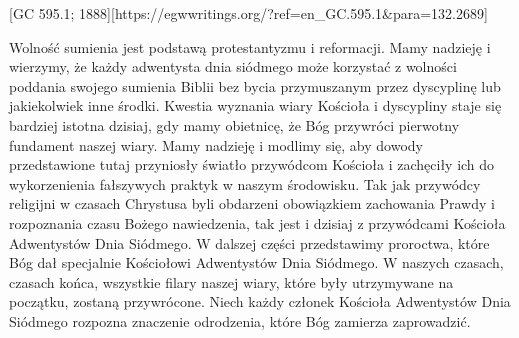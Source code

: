 [GC 595.1; 1888][https://egwwritings.org/?ref=en\_GC.595.1&para=132.2689]

Wolność sumienia jest podstawą protestantyzmu i reformacji. Mamy nadzieję i wierzymy, że każdy adwentysta dnia siódmego może korzystać z wolności poddania swojego sumienia Biblii bez bycia przymuszanym przez dyscyplinę lub jakiekolwiek inne środki. Kwestia wyznania wiary Kościoła i dyscypliny staje się bardziej istotna dzisiaj, gdy mamy obietnicę, że Bóg przywróci pierwotny fundament naszej wiary. Mamy nadzieję i modlimy się, aby dowody przedstawione tutaj przyniosły światło przywódcom Kościoła i zachęciły ich do wykorzenienia fałszywych praktyk w naszym środowisku. Tak jak przywódcy religijni w czasach Chrystusa byli obdarzeni obowiązkiem zachowania Prawdy i rozpoznania czasu Bożego nawiedzenia, tak jest i dzisiaj z przywódcami Kościoła Adwentystów Dnia Siódmego. W dalszej części przedstawimy proroctwa, które Bóg dał specjalnie Kościołowi Adwentystów Dnia Siódmego. W naszych czasach, czasach końca, wszystkie filary naszej wiary, które były utrzymywane na początku, zostaną przywrócone. Niech każdy członek Kościoła Adwentystów Dnia Siódmego rozpozna znaczenie odrodzenia, które Bóg zamierza zaprowadzić.


%

% 